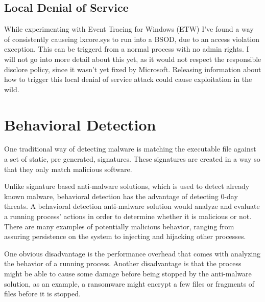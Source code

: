         \subsection{Local Denial of Service}
            While experimenting with Event Tracing for Windows (ETW) I've found a way of consistently causeing lxcore.sys to run into a BSOD, 
            due to an access violation exception. This can be triggerd from a normal process with no admin rights. I will not go into more 
            detail about this yet, as it would not respect the responsible disclore policy, since it wasn't yet fixed by Microsoft. Releasing
            information about how to trigger this local denial of service attack could cause exploitation in the wild.

    \section{Behavioral Detection}
        One traditional way of detecting malware is matching the executable file against a set of static, pre generated, signatures. These
        signatures are created in a way so that they only match malicious software.\cite{ASADMATT}

        Unlike signature based anti-malware solutions, which is used to detect already known malware, behavioral detection has the advantage of
        detecting 0-day threats. A behavioral detection anti-malware solution would analyze and evaluate a running process' actions in order to
        determine whether it is malicious or not. There are many examples of potentially malicious behavior, ranging from assuring persistence on
        the system to injecting and hijacking other processes.

        One obvious disadvantage is the performance overhead that comes with analyzing the behavior of a running process. Another disadvantage is
        that the process might be able to cause some damage before being stopped by the anti-malware solution, as an example, a ransomware might
        encrypt a few files or fragments of files before it is stopped.
        